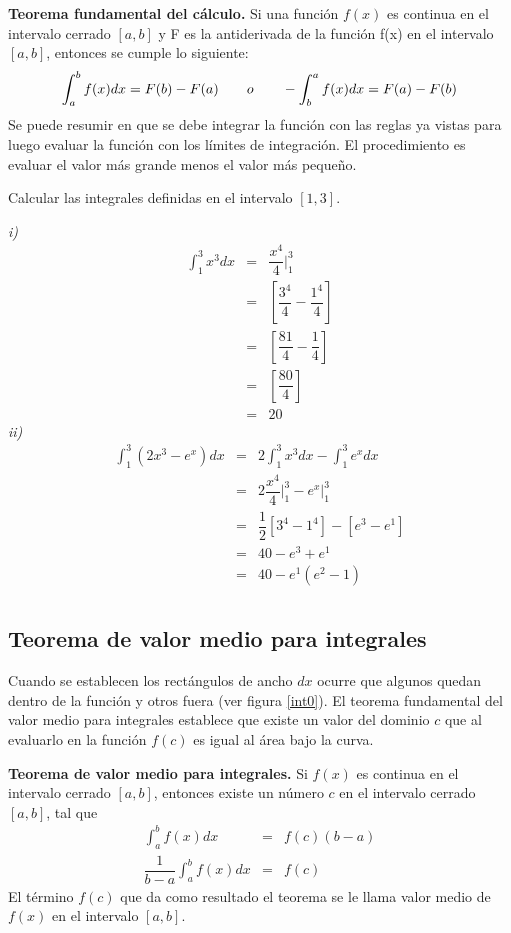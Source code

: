 \begin{mydef}
\textbf{Teorema fundamental del cálculo. } Si una función $f(x)$ es continua en el intervalo cerrado $[a,b]$ y F es la antiderivada de la función f(x) en el intervalo $[a,b]$, entonces se cumple lo siguiente:
\begin{eqnarray}
\int_{a}^{b}f(x)dx=F(b)-F(a) \hspace{20px} o \hspace{20px} -\int_{b}^{a}f(x)dx=F(a)-F(b)
\end{eqnarray}
Se puede resumir en que se debe integrar la función con las reglas ya vistas para luego evaluar la función con los límites de integración. El procedimiento es evaluar el valor más grande menos el valor más pequeño.
\end{mydef}

\begin{myexample}
Calcular las integrales definidas en el intervalo $[1,3]$.
\end{myexample}
\noindent\textit{i)}
\begin{eqnarray*}
\int_{1}^{3}x^{3}dx&=&\dfrac{x^{4}}{4}\Bigg|_{1}^{3}\\
&=&\left[\dfrac{3^{4}}{4}-\dfrac{1^{4}}{4} \right]\\
&=&\left[\dfrac{81}{4}-\dfrac{1}{4} \right]\\
&=&\left[\dfrac{80}{4} \right]\\
&=& 20
\end{eqnarray*}
\noindent\textit{ii)}
\begin{eqnarray*}
\int_{1}^{3}(2x^{3}-e^{x})dx&=& 2\int_{1}^{3}x^{3}dx-\int_{1}^{3}e^{x}dx\\
&=&2\dfrac{x^{4}}{4}\Bigg|_{1}^{3} -e^{x}\Bigg|_{1}^{3}\\
&=&\dfrac{1}{2}\left[3^{4}-1^{4}\right]-\left[e^{3}-e^{1}\right]\\
&=& 40-e^{3}+e^{1}\\
&=& 40-e^{1}(e^{2}-1)\\
\end{eqnarray*}
\subsection{Teorema de valor medio para integrales}

Cuando se establecen los rectángulos de ancho $dx$ ocurre que algunos quedan dentro de la función y otros fuera (ver figura \ref{int0}). El teorema fundamental del valor medio para integrales establece que existe un valor del dominio $c$ que al evaluarlo en la función $f(c)$ es igual al área bajo la curva. 
\begin{mydef}
\textbf{Teorema de valor medio para integrales. }Si $f(x)$ es continua en el intervalo cerrado $[a,b]$, entonces existe un número $c$ en el intervalo cerrado $[a,b]$, tal que 
\begin{eqnarray}
\int_{a}^{b}f(x)dx&=&f(c)(b-a)\\
\dfrac{1}{b-a}\int_{a}^{b}f(x)dx&=&f(c)
\end{eqnarray}
El término $f(c)$ que da como resultado el teorema se le llama valor medio de $f(x)$ en el intervalo $[a,b]$.
\end{mydef}


